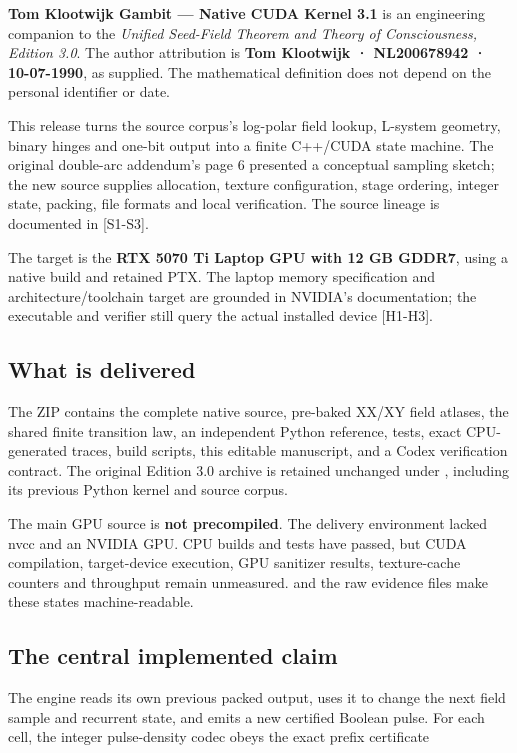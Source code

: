 \documentclass[11pt,a4paper]{article}
\begin{document}
\textbf{Tom Klootwijk Gambit --- Native CUDA Kernel 3.1} is an engineering companion to the \emph{Unified Seed-Field Theorem and Theory of Consciousness, Edition 3.0}. The author attribution is \textbf{Tom Klootwijk · NL200678942 · 10-07-1990}, as supplied. The mathematical definition does not depend on the personal identifier or date.

This release turns the source corpus's log-polar field lookup, L-system geometry, binary hinges and one-bit output into a finite C++/CUDA state machine. The original double-arc addendum's page 6 presented a conceptual sampling sketch; the new source supplies allocation, texture configuration, stage ordering, integer state, packing, file formats and local verification. The source lineage is documented in {[}S1-S3{]}.

The target is the \textbf{RTX 5070 Ti Laptop GPU with 12 GB GDDR7}, using a native  build and retained  PTX. The laptop memory specification and architecture/toolchain target are grounded in NVIDIA's documentation; the executable and verifier still query the actual installed device {[}H1-H3{]}.

\subsection{What is delivered}\label{what-is-delivered}

The ZIP contains the complete native source, pre-baked XX/XY field atlases, the shared finite transition law, an independent Python reference, tests, exact CPU-generated traces, build scripts, this editable manuscript, and a Codex verification contract. The original Edition 3.0 archive is retained unchanged under , including its previous Python kernel and source corpus.

The main GPU source is \textbf{not precompiled}. The delivery environment lacked nvcc and an NVIDIA GPU. CPU builds and tests have passed, but CUDA compilation, target-device execution, GPU sanitizer results, texture-cache counters and throughput remain unmeasured.  and the raw evidence files make these states machine-readable.

\subsection{The central implemented claim}\label{the-central-implemented-claim}

The engine reads its own previous packed output, uses it to change the next field sample and recurrent state, and emits a new certified Boolean pulse. For each cell, the integer pulse-density codec obeys the exact prefix certificate
\end{document}
